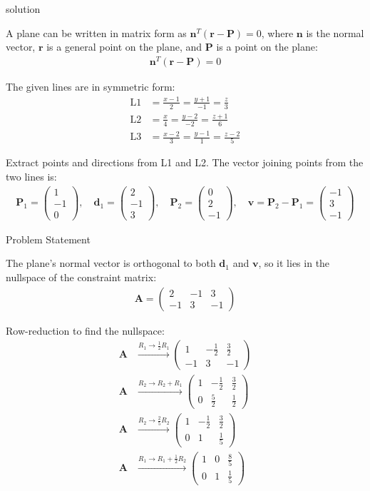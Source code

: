 \documentclass{beamer}
\numberwithin{equation}{section}
\theoremstyle{remark}
\newcommand{\myvec}[1]{\ensuremath{\begin{pmatrix}#1\end{pmatrix}}}
\let\vec\mathbf
\begin{document}
\begin{frame}{solution}

\noindent A plane can be written in matrix form as 
\(\vec{n}^T(\vec{r} - \vec{P}) = 0\), where \(\vec{n}\) is the normal vector, \(\vec{r}\) is a general point on the plane, and \(\vec{P}\) is a point on the plane:
\begin{align}
\vec{n}^T(\vec{r} - \vec{P}) = 0
\end{align}

\noindent The given lines are in symmetric form:
\begin{align}
\text{L1} &= \frac{x-1}{2} = \frac{y+1}{-1} = \frac{z}{3} \\
\text{L2} &= \frac{x}{4} = \frac{y-2}{-2} = \frac{z+1}{6} \\
\text{L3} &= \frac{x-2}{3} = \frac{y-1}{1} = \frac{z-2}{5}
\end{align}

\noindent Extract points and directions from L1 and L2. The vector joining points from the two lines is:
\begin{align}
\vec{P}_1 = \myvec{1\\-1\\0}, \quad \vec{d}_1 = \myvec{2\\-1\\3}, \quad
\vec{P}_2 = \myvec{0\\2\\-1}, \quad \vec{v} = \vec{P}_2 - \vec{P}_1 = \myvec{-1\\3\\-1}
\end{align}

\end{frame}
\begin{frame}{Problem Statement}

\noindent The plane's normal vector is orthogonal to both \(\vec{d}_1\) and \(\vec{v}\), so it lies in the nullspace of the constraint matrix:
\begin{align}
\vec{A} = \myvec{2 & -1 & 3 \\ -1 & 3 & -1}
\end{align}

\noindent Row-reduction to find the nullspace:
\begin{align}
\vec{A} &\xrightarrow{R_1 \to \tfrac{1}{2}R_1} \myvec{1 & -\tfrac{1}{2} & \tfrac{3}{2} \\ -1 & 3 & -1} \\[1mm]
\vec{A} &\xrightarrow{R_2 \to R_2 + R_1} \myvec{1 & -\tfrac{1}{2} & \tfrac{3}{2} \\ 0 & \tfrac{5}{2} & \tfrac{1}{2}} \\[1mm]
\vec{A} &\xrightarrow{R_2 \to \tfrac{2}{5}R_2} \myvec{1 & -\tfrac{1}{2} & \tfrac{3}{2} \\ 0 & 1 & \tfrac{1}{5}} \\[1mm]
\vec{A} &\xrightarrow{R_1 \to R_1 + \tfrac{1}{2}R_2} \myvec{1 & 0 & \tfrac{8}{5} \\ 0 & 1 & \tfrac{1}{5}}
\end{align}
\end{frame}
\end{document}
